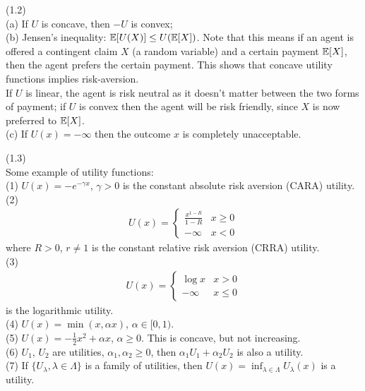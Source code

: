 \documentclass[a4paper]{article}
\begin{document}
\begin{rem} (1.2)\\
(a) If $U$ is concave, then $-U$ is convex;\\
(b) Jensen's inequality: $\mathbb{E}[U(X)] \leq U(\mathbb{E}[X])$. Note that this means if an agent is offered a contingent claim $X$ (a random variable) and a certain payment $\mathbb{E}[X]$, then the agent prefers the certain payment. This shows that concave utility functions implies risk-aversion.\\
If $U$ is linear, the agent is risk neutral as it doesn't matter between the two forms of payment; if $U$ is convex then the agent will be risk friendly, since $X$ is now preferred to $\mathbb{E}[X]$.\\
(c) If $U(x) = -\infty$ then the outcome $x$ is completely unacceptable.
\end{rem}

\begin{eg}(1.3)\\
Some example of utility functions:\\
(1) $U(x) = -e^{-\gamma x}$, $\gamma>0$ is the constant absolute risk aversion (CARA) utility.\\
(2) 
\begin{equation*}
\begin{aligned}
U(x) = \left\{\begin{array}{ll}
\frac{x^{1-R}}{1-R} & x \geq 0\\
-\infty & x < 0
\end{array}
\right.
\end{aligned}
\end{equation*}
where $R>0$, $r \neq 1$ is the constant relative risk aversion (CRRA) utility.\\
(3) 
\begin{equation*}
\begin{aligned}
U(x) = \left\{\begin{array}{ll}
\log x & x > 0\\
-\infty & x \leq 0
\end{array}
\right.
\end{aligned}
\end{equation*}
is the logarithmic utility.\\
(4) $U(x) = \min(x,\alpha x)$, $\alpha \in [0,1)$.\\
(5) $U(x) = -\frac{1}{2} x^2 + \alpha x$, $\alpha \geq 0$. This is concave, but not increasing.\\
(6) $U_1$, $U_2$ are utilities, $\alpha_1,\alpha_2 \geq 0$, then $\alpha_1 U_1 + \alpha_2 U_2$ is also a utility.\\
(7) If $\{U_\lambda,\lambda \in \Lambda\}$ is a family of utilities, then $U(x) = \inf_{\lambda \in \Lambda} U_\lambda (x)$ is a utility.
\end{eg}
\end{document}
